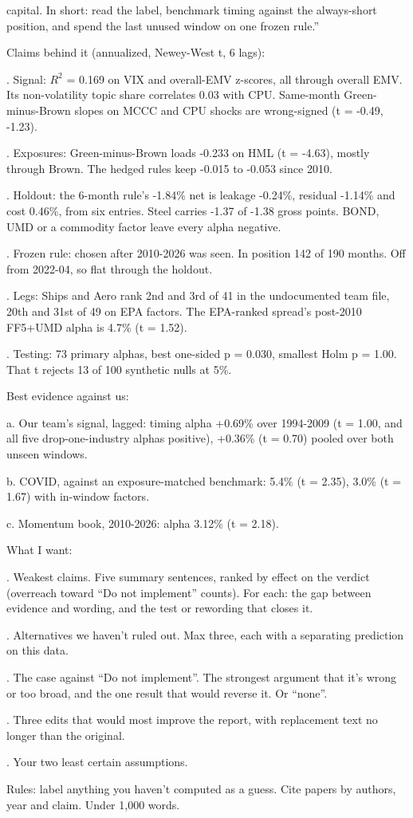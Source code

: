 capital. In short: read the label, benchmark timing against the always-short position, and spend the last unused window on one frozen rule.''
\medskip
\par\noindent Claims behind it (annualized, Newey-West t, 6 lags):
\par{}. Signal: $R^2$ = 0.169 on VIX and overall-EMV z-scores, all through overall EMV. Its non-volatility topic share correlates 0.03 with CPU. Same-month Green-minus-Brown slopes on MCCC and CPU shocks are wrong-signed (t = -0.49, -1.23).
\par{}. Exposures: Green-minus-Brown loads -0.233 on HML (t = -4.63), mostly through Brown. The hedged rules keep -0.015 to -0.053 since 2010.
\par{}. Holdout: the 6-month rule's -1.84\% net is leakage -0.24\%, residual -1.14\% and cost 0.46\%, from six entries. Steel carries -1.37 of -1.38 gross points. BOND, UMD or a commodity factor leave every alpha negative.
\par{}. Frozen rule: chosen after 2010-2026 was seen. In position 142 of 190 months. Off from 2022-04, so flat through the holdout.
\par{}. Legs: Ships and Aero rank 2nd and 3rd of 41 in the undocumented team file, 20th and 31st of 49 on EPA factors. The EPA-ranked spread's post-2010 FF5+UMD alpha is 4.7\% (t = 1.52).
\par{}. Testing: 73 primary alphas, best one-sided p = 0.030, smallest Holm p = 1.00. That t rejects 13 of 100 synthetic nulls at 5\%.
\medskip
\par\noindent Best evidence against us:
\par\noindent a. Our team's signal, lagged: timing alpha +0.69\% over 1994-2009 (t = 1.00, and all five drop-one-industry alphas positive), +0.36\% (t = 0.70) pooled over both unseen windows.
\par\noindent b. COVID, against an exposure-matched benchmark: 5.4\% (t = 2.35), 3.0\% (t = 1.67) with in-window factors.
\par\noindent c. Momentum book, 2010-2026: alpha 3.12\% (t = 2.18).
\medskip
\par\noindent What I want:
\par{}. Weakest claims. Five summary sentences, ranked by effect on the verdict (overreach toward ``Do not implement'' counts). For each: the gap between evidence and wording, and the test or rewording that closes it.
\par{}. Alternatives we haven't ruled out. Max three, each with a separating prediction on this data.
\par{}. The case against ``Do not implement''. The strongest argument that it's wrong or too broad, and the one result that would reverse it. Or ``none''.
\par{}. Three edits that would most improve the report, with replacement text no longer than the original.
\par{}. Your two least certain assumptions.
\medskip
\par\noindent Rules: label anything you haven't computed as a guess. Cite papers by authors, year and claim. Under 1,000 words.
